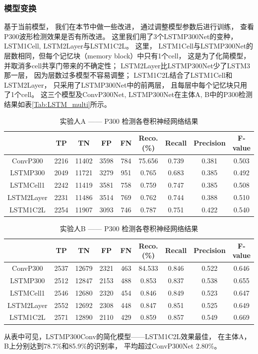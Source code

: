 \subsubsection{模型变换}

基于当前模型， 我们在本节中做一些改进， 通过调整模型参数后进行训练， 查看P300波形检测效果是否有所改进。 这里我们用了3个LSTMP300Net的变种， LSTM1Cell, LSTM2Layer与LSTM1C2L。 这里，  LSTM1Cell与LSTMP300Net的层数相同，但每个记忆块（memory block）中只有1个cell， 这是为了化简模型， 并取消多cell共享门带来的不确定性； LSTM2Layer比LSTMP300Net少了LSTM3那一层， 因为层数过多模型不容易调整； LSTM1C2L结合了LSTM1Cell和LSTM2Layer， 只采用了LSTMP300Net中的前两层， 且每层中每个记忆块只用了1个cell。 这三个模型及ConvP300Net, LSTMP300Net在主体A, B中的P300检测结果如表\ref{Tab:LSTM_multi}所示。

\begin{table}[ht]
\centering
  \caption{实验人A —— P300 检测各卷积神经网络结果}
  \begin{tabular}{|c||c|c|c|c|c|c|c|c|}
  \hline
   & TP & TN & FP & FN & Reco.(\%) & Recall & Precision & F-value \\
  \hline\hline
	ConvP300 & 2216 & 11402 & 3598 & 784 & 75.656  & 0.739  & 0.381  & 0.503 \\
	\hline
	LSTMP300 & 2049&	11721&	3279&	951&	0.765& 	0.683& 	0.385& 	0.492  \\
	\hline
	LSTMCell1 & 2242 & 11419 & 3581 &	758&	0.759 & 0.747 &	0.385& 0.508\\
	\hline
	LSTM2Layer & 2231	&11486&	3514&	769&	0.762& 	0.744& 	0.388& 	0.510 \\
	\hline
	LSTM1C2L & 2254&	11907&	3093&	746&	0.787& 	0.751& 	0.422& 	0.540  \\
	\hline
  \end{tabular}
  \centering \label{tab:p300_cnn_A}
\end{table}


\begin{table}[ht]
\centering
  \caption{实验人B —— P300 检测各卷积神经网络结果}
  \begin{tabular}{|c||c|c|c|c|c|c|c|c|}
  \hline
   & TP & TN & FP & FN & Reco.(\%) & Recall & Precision & F-value \\
  \hline\hline
  	ConvP300 & 2537 & 12679 & 2321 & 463 & 84.533 & 0.846 & 0.522 & 0.646 \\
	LSTMP300 & 2512	&12847	&2153	&488	&0.853 &	0.837 &	0.538 &	0.655   \\
	\hline
	LSTMCell1 & 2546&	12680	&2320	&454	&0.846 &	0.849 &	0.523 &	0.647 \\
	\hline
	LSTM2Layer & 2552&	12692&	2308&448	&0.847 &	0.851 	&0.525& 	0.649  \\
	\hline
	LSTM1C2L & 2571	&12890&	2110&	429	&0.859 &	0.857 &	0.549 &	0.669 \\
  \hline
  \end{tabular}
  \centering \label{tab:p300_cnn_B}
\end{table}


从表中可见，LSTMP300Conv的简化模型——LSTM1C2L效果最佳， 在主体A，B上分别达到78.7\%和85.9\%的识别率， 平均超过ConvP300Net 2.80\%。